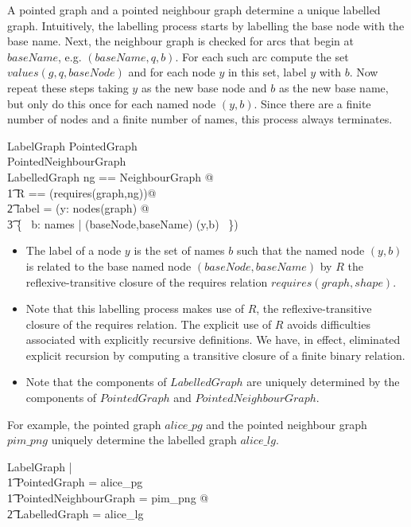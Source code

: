 \documentclass{article}
\begin{document}
A pointed graph and a pointed neighbour graph determine a unique labelled graph.
Intuitively, the labelling process starts by labelling the base node with the base name. 
Next, the neighbour graph is checked for arcs that begin at $baseName$, e.g. $(baseName, q, b)$.
For each such arc compute the set $values(g,q,baseNode)$ and for each node $y$ in this set, label $y$ with $b$.
Now repeat these steps taking $y$ as the new base node and $b$ as the new base name, but only do this
once for each named node $(y,b)$.
Since there are a finite number of nodes and a finite number of names, this process always terminates.
\begin{schema}{LabelGraph}
	PointedGraph \\
	PointedNeighbourGraph \\
	LabelledGraph
\where
	\LET ng == \theta NeighbourGraph @ \\
\t1		\LET R == (requires(graph,ng))\star @ \\
\t2			label = (\lambda y: nodes(graph) @ \\
\t3				\{~ b: names | (baseNode,baseName)  (y,b) ~\})
\end{schema}
\begin{itemize}
\item The label of a node $y$ is the set of names $b$ such that the named node $(y,b)$ is related to the 
base named node $(baseNode,baseName)$ by $R$ the reflexive-transitive closure of the requires relation $requires(graph,shape)$.
\item Note that this labelling process makes use of $R$, the reflexive-transitive closure of the requires relation.
The explicit use of $R$ avoids difficulties associated with explicitly recursive definitions. 
We have, in effect, eliminated explicit recursion by computing a transitive closure of a finite binary relation.
\item Note that the components of $LabelledGraph$ are uniquely determined by the components of $PointedGraph$
and $PointedNeighbourGraph$. 
\end{itemize}

For example, the pointed graph $alice\_pg$ and the pointed neighbour graph $pim\_png$ uniquely determine
the labelled graph $alice\_lg$.
\begin{zed}
	\forall LabelGraph | \\
\t1		\theta PointedGraph = alice\_pg \land \\
\t1		\theta PointedNeighbourGraph = pim\_png @ \\
\t2			\theta LabelledGraph = alice\_lg
\end{zed}
\end{document}
